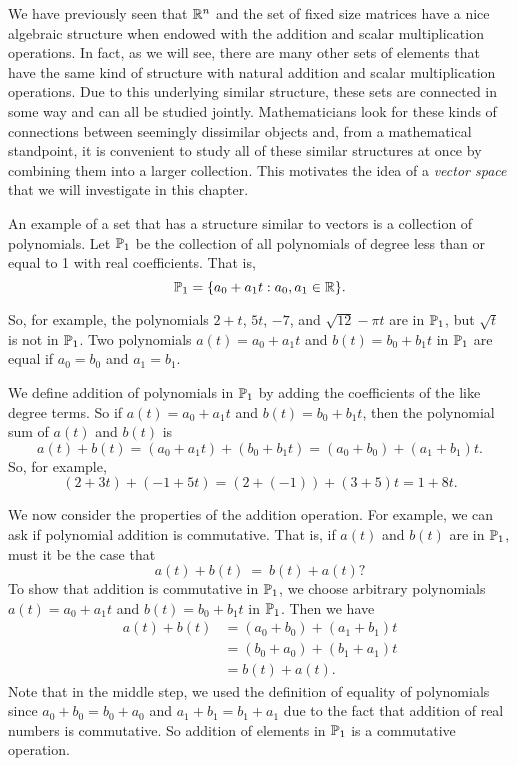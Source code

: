
We have previously seen that $\mathbb{R}^n$ and the set of fixed size matrices have a nice algebraic structure when endowed with the addition and scalar multiplication operations. In fact, as we will see, there are many other sets of elements that have the same kind of structure with natural addition and scalar multiplication operations. Due to this underlying similar structure, these sets are connected in some way and can all be studied jointly. Mathematicians look for these kinds of connections between seemingly dissimilar objects and, from a mathematical standpoint, it is convenient to study all of these similar structures at once by combining them into a larger collection. This motivates the idea of a \emph{vector space} that we will investigate in this chapter.

An example of a set that has a structure similar to vectors is a collection of polynomials. Let $\mathbb{P}_1$ be the collection of all polynomials of degree less than or equal to 1 with real coefficients. That is,
\[\mathbb{P}_1 = \{ a_0 + a_1t : a_0, a_1 \in \mathbb{R}\}.\]

So, for example, the polynomials $2+t$, $5t$, $-7$, and $\sqrt{12}-\pi t$ are in $\mathbb{P}_1$, but $\sqrt{t}$ is not in $\mathbb{P}_1$. Two polynomials $a(t)=a_0+a_1t$ and $b(t)=b_0+b_1t$ in $\mathbb{P}_1$ are equal if $a_0=b_0$ and $a_1=b_1$. 

We define addition of polynomials in $\mathbb{P}_1$ by adding the coefficients of the like degree terms. So if $a(t) = a_0+a_1t$ and $b(t) = b_0+b_1t$, then the polynomial sum of $a(t)$ and $b(t)$ is 
\[a(t)+b(t) = (a_0+a_1t) + (b_0+b_1t) = (a_0+b_0) + (a_1+b_1)t.\]
So, for example,
\[ (2+3t)+(-1+5t) = (2+(-1)) + (3+5)t = 1+8 t . \]

We now consider the properties of the addition operation. For example, we can ask if polynomial addition is commutative. That is, if $a(t)$ and $b(t)$ are in $\mathbb{P}_1$, must it be the case that 
\[a(t)+b(t)~=~b(t)+a(t)?\]
To show that addition is commutative in $\mathbb{P}_1$, we choose arbitrary polynomials $a(t) = a_0 + a_1t$ and $b(t) = b_0 + b_1t$ in $\mathbb{P}_1$. Then we have 
\begin{align*}
a(t)+b(t) &= (a_0+b_0) + (a_1+b_1)t \\
	&= (b_0+a_0) + (b_1+a_1)t \\
	&= b(t)+a(t).
\end{align*}
Note that in the middle step, we used the definition of equality of polynomials since $a_0+b_0=b_0+a_0$ and $a_1+b_1=b_1+a_1$ due to the fact that addition of real numbers is commutative. So addition of elements in $\mathbb{P}_1$ is a commutative operation. 



